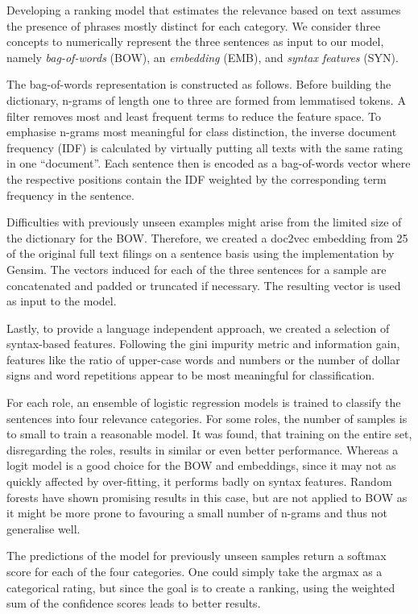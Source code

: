 Developing a ranking model that estimates the relevance based on text assumes the presence of phrases mostly distinct for each category.
We consider three concepts to numerically represent the three sentences as input to our model, namely \textit{bag-of-words} (BOW), an \textit{embedding} (EMB), and \textit{syntax features} (SYN).

The bag-of-words representation is constructed as follows. 
Before building the dictionary, n-grams of length one to three are formed from lemmatised tokens. 
A filter removes most and least frequent terms to reduce the feature space. To emphasise n-grams most meaningful for class distinction, the inverse document frequency (IDF) is calculated by virtually putting all texts with the same rating in one ``document''. 
Each sentence then is encoded as a bag-of-words vector where the respective positions contain the IDF weighted by the corresponding term frequency in the sentence.

Difficulties with previously unseen examples might arise from the limited size of the dictionary for the BOW.
Therefore, we created a doc2vec\cite{le2014distributed} embedding from 25 of the original full text filings on a sentence basis using the implementation by Gensim\cite{gensim}.
The vectors induced for each of the three sentences for a sample are concatenated and padded or truncated if necessary.
The resulting vector is used as input to the model.

Lastly, to provide a language independent approach, we created a selection of syntax-based features.
Following the gini impurity metric and information gain, features like the ratio of upper-case words and numbers or the number of dollar signs and word repetitions appear to be most meaningful for classification.

For each role, an ensemble of logistic regression models is trained to classify the sentences into four relevance categories.
For some roles, the number of samples is to small to train a reasonable model.
It was found, that training on the entire set, disregarding the roles, results in similar or even better performance.
Whereas a logit model is a good choice for the BOW and embeddings, since it may not as quickly affected by over-fitting, it performs badly on syntax features.
Random forests have shown promising results in this case, but are not applied to BOW as it might be more prone to favouring a small number of n-grams and thus not generalise well.

The predictions of the model for previously unseen samples return a softmax score for each of the four categories.
One could simply take the argmax as a categorical rating, but since the goal is to create a ranking, using the weighted sum of the confidence scores leads to better results.

